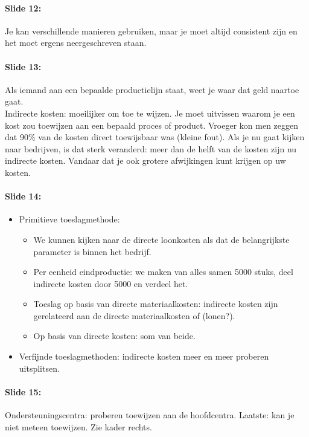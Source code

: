 \documentclass[10pt,a4paper]{report}
\begin{document}
\paragraph{Slide 12:} Je kan verschillende manieren gebruiken, maar je moet altijd consistent zijn en het moet ergens neergeschreven staan.

\paragraph{Slide 13:} Als iemand aan een bepaalde productielijn staat, weet je waar dat geld naartoe gaat. \\
Indirecte kosten: moeilijker om toe te wijzen. Je moet uitvissen waarom je een kost zou toewijzen aan een bepaald proces of product. Vroeger kon men zeggen dat 90\% van de kosten direct toewijsbaar was (kleine fout). Als je nu gaat kijken naar bedrijven, is dat sterk veranderd: meer dan de helft van de kosten zijn nu indirecte kosten. Vandaar dat je ook grotere afwijkingen kunt krijgen op uw kosten.

\paragraph{Slide 14:}
\begin{itemize}
\item Primitieve toeslagmethode:
\begin{itemize}
\item We kunnen kijken naar de directe loonkosten als dat de belangrijkste parameter is binnen het bedrijf. 
\item Per eenheid eindproductie: we maken van alles samen 5000 stuks, deel indirecte kosten door 5000 en verdeel het.
\item Toeslag op basis van directe materiaalkosten: indirecte kosten zijn gerelateerd aan de directe materiaalkosten of (lonen?).
\item Op basis van directe kosten: som van beide.
\end{itemize}
\item Verfijnde toeslagmethoden: indirecte kosten meer en meer proberen uitsplitsen.
\end{itemize}

\paragraph{Slide 15:} Ondersteuningscentra: proberen toewijzen aan de hoofdcentra. Laatste: kan je niet meteen toewijzen. Zie kader rechts.
\end{document}
